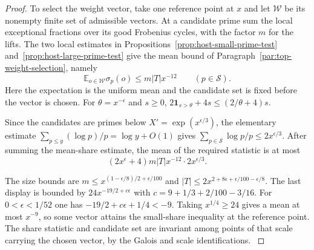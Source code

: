 \begin{proof}
To select the weight vector, take one reference point at \(x\)
and let \(\mathcal W\) be its nonempty finite set of admissible
vectors. At a candidate prime sum the local exceptional fractions
over its good Frobenius cycles, with the factor \(m\) for the lifts.
The two local estimates in Propositions~\ref{prop:host-small-prime-test}
and~\ref{prop:host-large-prime-test} give the mean bound of
Paragraph~\ref{par:top-weight-selection}, namely
\[
     \mathbb E_{o\in\mathcal W}\sigma_p(o)\le m|T|x^{-12}
                         \qquad(p\in\mathcal S).
\] Here the expectation is the uniform
mean and the candidate set is fixed before the vector is chosen.
For \(\theta=x^{-\epsilon}\) and \(s\ge0\),
\(2\mathbf1_{s>\theta}+4s\le(2/\theta+4)s\).

Since the candidates are primes below \(X'=\exp(x^{\epsilon/3})\),
the elementary estimate \(\sum_{p\le y}(\log p)/p=\log y+O(1)\) gives
\(\sum_{p\in\mathcal S}\log p/p\le2x^{\epsilon/3}\).
After summing the mean-share estimate, the mean of the required
statistic is at most
\[
 (2x^\epsilon+4)m|T|x^{-12}\cdot 2x^{\epsilon/3}.
\]

The size bounds are \(m\le x^{(1-\epsilon/8)/2+\epsilon/100}\)
and \(|T|\le2x^{2+8\epsilon+\epsilon/100-\epsilon/8}\).
The last display is bounded by \(24x^{-19/2+c\epsilon}\) with
\(c=9+1/3+2/100-3/16\). For \(0<\epsilon<1/52\) one has
\(-19/2+c\epsilon+1/4<-9\). Taking \(x^{1/4}\ge24\)
gives a mean at most \(x^{-9}\), so some vector attains the
small-share inequality at the reference point. The share statistic
and candidate set are invariant among points of that scale carrying
the chosen vector, by the Galois and scale identifications.
\label{cor:frames-9}

\end{proof}

